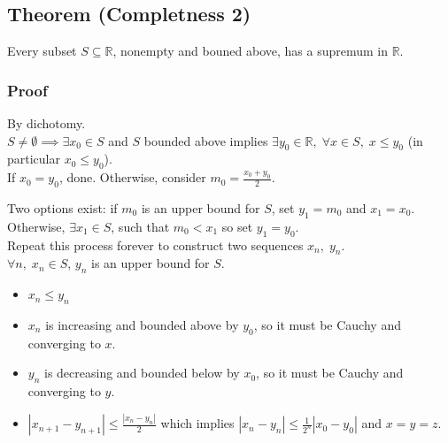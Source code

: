 \documentclass[11pt]{article}
\newcommand{\0}{\emptyset}
\newcommand{\R}{\mathbb{R}}
\begin{document}
\subsection*{Theorem (Completness 2)}
\label{sec:orge0389b2}
Every subset \(S\subseteq\R\), nonempty and bouned above, has a supremum in \(\R\).\\[0pt]
\subsubsection*{Proof}
\label{sec:org8454d6d}
By dichotomy.\\[0pt]
\(S\neq\0\implies\exists x_{0}\in S\) and \(S\) bounded above implies \(\exists y_{0}\in\R,\;\forall x\in S,\;x\leq y_{0}\) (in particular \(x_{0}\leq y_{0}\)).\\[0pt]
If \(x_{0}=y_{0}\), done. Otherwise, consider \(m_{0}=\frac{x_{0}+y_{0}}{2}\).\\[0pt]
Two options exist: if \(m_{0}\) is an upper bound for \(S\), set \(y_{1}=m_{0}\) and \(x_{1}=x_{0}\).\\[0pt]
Otherwise, \(\exists x_{1}\in S\), such that \(m_{0}<x_{1}\) so set \(y_{1}=y_{0}\).\\[0pt]
Repeat this process forever to construct two sequences \(x_{n},\;y_{n}\).\\[0pt]
\(\forall n,\;x_{n}\in S\), \(y_{n}\) is an upper bound for \(S\).\\[0pt]
\begin{itemize}
\item \(x_{n}\leq y_{n}\)\\[0pt]
\item \(x_{n}\) is increasing and bounded above by \(y_{0}\), so it must be Cauchy and converging to \(x\).\\[0pt]
\item \(y_{n}\) is decreasing and bounded below by \(x_{0}\), so it must be Cauchy and converging to \(y\).\\[0pt]
\item \(|x_{n+1}-y_{n+1}|\leq\frac{|x_{n}-y_{n}|}{2}\) which implies \(|x_{n}-y_{n}|\leq\frac{1}{2^{n}}|x_{0}-y_{0}|\) and \(x=y=z\).\\[0pt]
\end{itemize}
\end{document}
